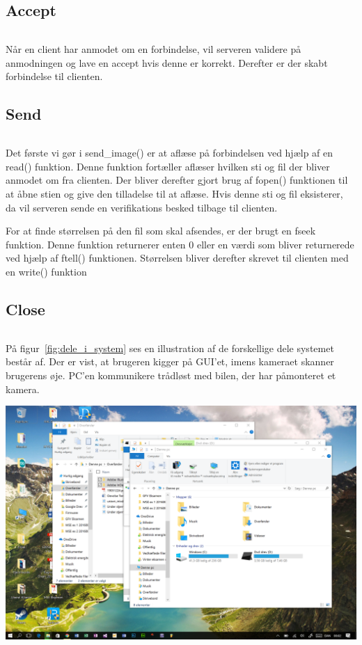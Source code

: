 \documentclass[12pt,fleqn,a4paper]{report}
\begin{document}
\subsection{Accept}
\begin{lstlisting}[language=C++]

\end{lstlisting}

Når en client har anmodet om en forbindelse, vil serveren validere på anmodningen og lave en accept hvis denne er korrekt. Derefter er der skabt forbindelse til clienten. 

\subsection{Send}
\begin{lstlisting}[language=C++]

\end{lstlisting}

 Det første vi gør i send_image() er at aflæse på forbindelsen ved hjælp af en read() funktion. Denne funktion fortæller aflæser hvilken sti og fil der bliver anmodet om fra clienten. 
 Der bliver derefter gjort brug af fopen() funktionen til at åbne stien og give den tilladelse til at aflæse.
 Hvis denne sti og fil eksisterer, da vil serveren sende en verifikations besked tilbage til clienten.
 
 
 For at finde størrelsen på den fil som skal afsendes, er der brugt en fseek funktion. Denne funktion returnerer enten 0 eller en værdi som bliver returnerede ved hjælp af ftell() funktionen. 
 Størrelsen bliver derefter skrevet til clienten med en write() funktion
 
 
 
\subsection{Close}
\begin{lstlisting}[language=C++]

\end{lstlisting}



På figur~\ref{fig:dele_i_system} ses en illustration af de forskellige dele systemet består af. Der er vist, at brugeren kigger på GUI’et, imens kameraet skanner brugerens øje. PC’en kommunikere trådløst med bilen, der har påmonteret et kamera.

\begin{center}
	\includegraphics[width=0.9 \textwidth]{hej1.png}
	\label{fig:dele_i_system}
\end{center}

\newpage
\end{document}
